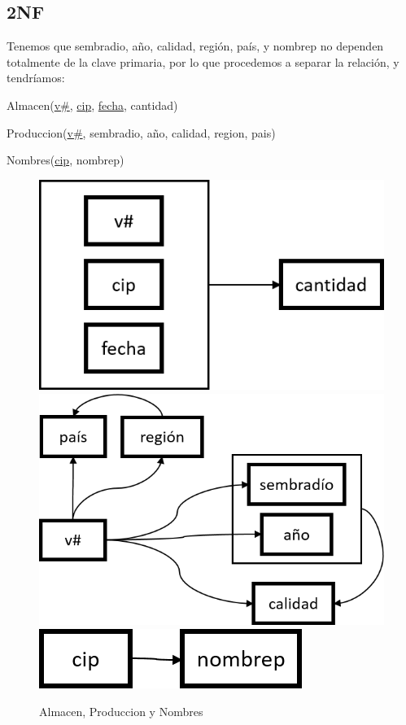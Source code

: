 \newpage
\subsection*{2NF}
Tenemos que sembradio, año, calidad, región, país, y nombrep no dependen totalmente de la clave primaria, por lo que procedemos a separar la relación, y tendríamos:

Almacen(\underline{v\#}, \underline{cip}, \underline{fecha}, cantidad)

Produccion(\underline{v\#}, sembradio, año, calidad, region, pais)

Nombres(\underline{cip}, nombrep)

\begin{figure}[H]
	\centering
	\includegraphics[scale=0.52]{img/2nf_almacen.png} 
	\hspace{0.4cm} \vrule \hspace{0.4cm}
	\includegraphics[scale=0.52]{img/2nf_produccion.png}
	\hspace{0.4cm} \vrule \hspace{0.4cm}
	\includegraphics[scale=0.52]{img/2nf_nombres.png}
	\caption{Almacen, Produccion y Nombres}
\end{figure}



